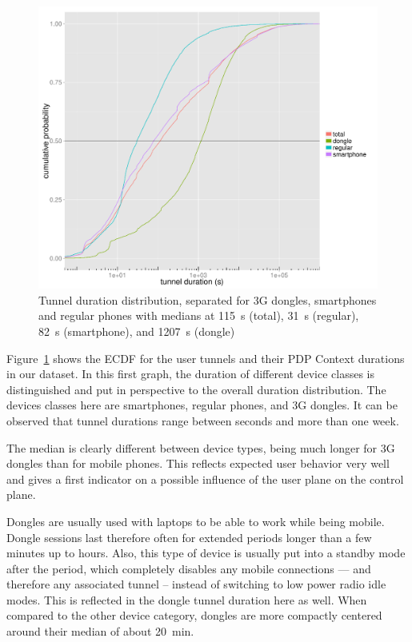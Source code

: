 \begin{figure}[htb]
    \centering
    \includegraphics[width=\textwidth]{images/R-tunnel-duration-device-type.pdf}
    \caption{Tunnel duration distribution, separated for 3G dongles, smartphones and regular phones with medians at \SI{115}{\second} (total), \SI{31}{\second} (regular), \SI{82}{\second} (smartphone), and \SI{1207}{\second} (dongle)}
    \label{c4:fig:cdf-duration-device-class}
\end{figure}

Figure~\ref{c4:fig:cdf-duration-device-class} shows the \gls{ECDF} for the user tunnels and their \gls{PDP} Context durations in our dataset. In this first graph, the duration of different device classes is distinguished and put in perspective to the overall duration distribution. The devices classes here are smartphones, regular phones, and \gls{3G} dongles. It can be observed that tunnel durations range between seconds and more than one week.

The median is clearly different between device types, being much longer for \gls{3G} dongles than for mobile phones. This reflects expected user behavior very well and gives a first indicator on a possible influence of the user plane on the control plane.

Dongles are usually used with laptops to be able to work while being mobile. Dongle sessions last therefore often for extended periods longer than a few minutes up to hours. Also, this type of device is usually put into a standby mode after the period, which completely disables any mobile connections --- and therefore any associated tunnel -- instead of switching to low power radio idle modes. This is reflected in the dongle tunnel duration here as well. When compared to the other device category, dongles are more compactly centered around their median of about \SI{20}{\minute}.

